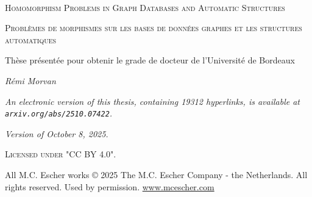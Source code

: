 \newpage
\thispagestyle{empty}
~
\newpage
\thispagestyle{empty}
\begin{fullwidth}
	\setlength{\parindent}{0pt}
	{
		\par{\scshape\Large Homomorphism Problems in Graph Databases and Automatic Structures}
		\par{\scshape Problèmes de morphismes sur les bases de données graphes et les structures automatiques}
		\vspace{1cm}
		\par Thèse présentée pour obtenir le grade de docteur de l'Université de Bordeaux
		\vspace{1cm}
		\par\emph{\Large Rémi Morvan}
	}

	
	\vfill
	\par\emph{An electronic version of this thesis, containing 19312 hyperlinks,
	is available at \texttt{arxiv.org/abs/2510.07422}.}
	\vspace{1cm}
	\par\textit{Version of October 8, 2025.}
	\par\textsc{Licensed under "CC BY 4.0".}
	\newline
	\par{\footnotesize All M.C. Escher works © 2025 The M.C. Escher Company - the Netherlands. All rights reserved. Used by permission. \url{www.mcescher.com}}
\end{fullwidth}